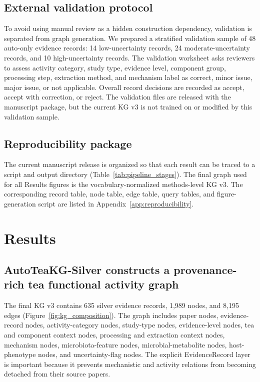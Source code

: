 \documentclass[11pt]{article}
\begin{document}
\subsection{External validation protocol}

To avoid using manual review as a hidden construction dependency, validation is separated from graph generation. We prepared a stratified validation sample of 48 auto-only evidence records: 14 low-uncertainty records, 24 moderate-uncertainty records, and 10 high-uncertainty records. The validation worksheet asks reviewers to assess activity category, study type, evidence level, component group, processing step, extraction method, and mechanism label as correct, minor issue, major issue, or not applicable. Overall record decisions are recorded as accept, accept with correction, or reject. The validation files are released with the manuscript package, but the current KG v3 is not trained on or modified by this validation sample.

\subsection{Reproducibility package}

The current manuscript release is organized so that each result can be traced to a script and output directory (Table~\ref{tab:pipeline_stages}). The final graph used for all Results figures is the vocabulary-normalized methods-level KG v3. The corresponding record table, node table, edge table, query tables, and figure-generation script are listed in Appendix~\ref{app:reproducibility}.

\section{Results}

\subsection{AutoTeaKG-Silver constructs a provenance-rich tea functional activity graph}

The final KG v3 contains 635 silver evidence records, 1,989 nodes, and 8,195 edges (Figure~\ref{fig:kg_composition}). The graph includes paper nodes, evidence-record nodes, activity-category nodes, study-type nodes, evidence-level nodes, tea and component context nodes, processing and extraction context nodes, mechanism nodes, microbiota-feature nodes, microbial-metabolite nodes, host-phenotype nodes, and uncertainty-flag nodes. The explicit EvidenceRecord layer is important because it prevents mechanistic and activity relations from becoming detached from their source papers.
\end{document}
